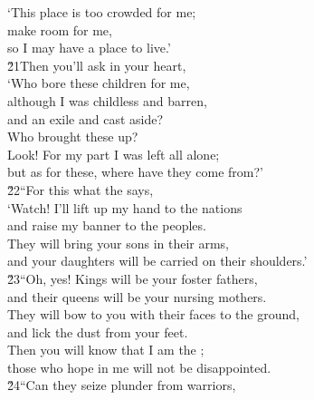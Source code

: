 \begin{poetry}
\poeml `This place is too crowded for me; \\
\poemll    make room for me, \\
\poemlll       so I may have a place to live.' \\
\poeml \v{21}Then you'll ask in your heart, \\
\poemll    `Who bore these children for me, \\
\poeml although I was childless and barren, \\
\poemll    and an exile and cast aside? \\
\poeml Who brought these up? \\
\poemll    Look! For my part I was left all alone; \\
\poemlll       but as for these, where have they come from?' \\
\poeml \v{22}``For this what the  says, \\
\poemll    `Watch! I'll lift up my hand to the nations \\
\poeml and raise my banner to the peoples. \\
\poemll    They will bring your sons in their arms, \\
\poemlll       and your daughters will be carried on their shoulders.' \\
\poeml \v{23}``Oh, yes! Kings will be your foster fathers, \\
\poemll    and their queens will be your nursing mothers. \\
\poeml They will bow to you with their faces to the ground, \\
\poemll    and lick the dust from your feet. \\
\poeml Then you will know that I am the ; \\
\poemll    those who hope in me will not be disappointed. \\
\poeml \v{24}``Can they seize plunder from warriors, \\

\end{poetry}
